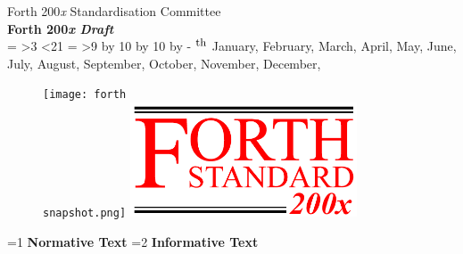 \begin{titlepage}
\begin{flushright}
\LARGE
Forth 200\emph{x} Standardisation Committee \\[.2in]
\textbf{Forth 200\emph{x} \textit{Draft \docversion}} \\[.2in]

\number\day%
%
\makeatletter
\@tempcnta=\day
\ifnum\@tempcnta>3
	\ifnum\@tempcnta<21
	\fi
\fi
%
\@tempcntb=\@tempcnta
\ifnum\@tempcnta>9
	\divide  \@tempcnta by 10
	\multiply\@tempcnta by 10
	\advance \@tempcntb by -\@tempcnta
\fi
%
$^{\mbox{\small
\ifcase\@tempcntb
    th%
\or st%
\or nd%
\or rd%
\else th\fi
}}$
\makeatother
%
\ifcase\month
\or January,
\or February,
\or March,
\or April,
\or May,
\or June,
\or July,
\or August,
\or September,
\or October,
\or November,
\or December,
\fi
%
\number\year
\end{flushright}

\vfill
\begin{figure}[ht]
  \begin{center}
	\ifrelease
		\texttt{[image: forth\\snapshot.png]}
	\else
		\includegraphics[bb=0 0 500 252,width=0.6\textwidth]{logo.png}
	\fi
  \end{center}
\end{figure}
\vfill


\makeatletter
\@tempswafalse
\ifinline
	\begin{center}
		\huge %
		\ifnum\value{part}=1 \textbf{Normative Text}\fi
		\ifnum\value{part}=2 \textbf{Informative Text}\fi
	\end{center}
\fi
\makeatother

\vfill


%



\end{titlepage}
